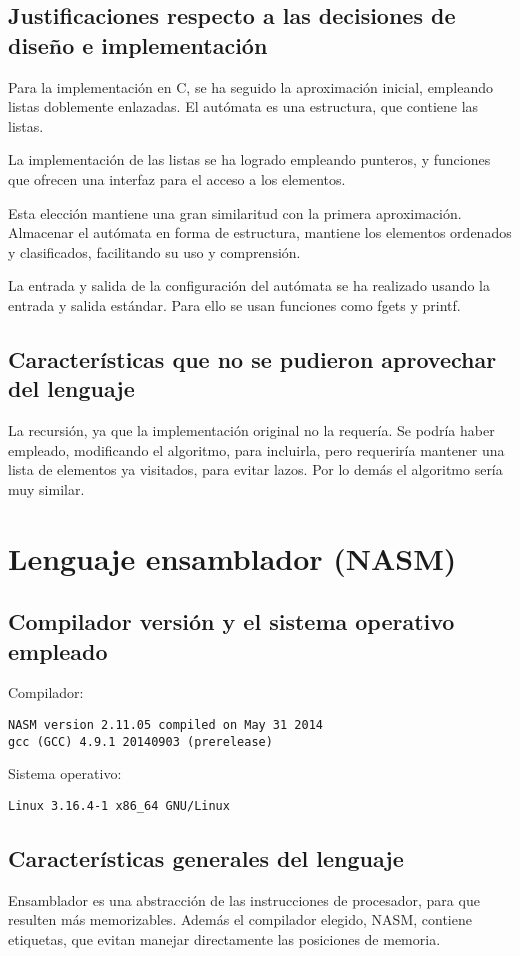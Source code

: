 \documentclass[12pt,a4paper]{article}
\begin{document}
\subsection{Justificaciones respecto a las decisiones de diseño e 
implementación}
Para la implementación en C, se ha seguido la aproximación inicial, empleando
listas doblemente enlazadas. El autómata es una estructura, que contiene las
listas.

La implementación de las listas se ha logrado empleando punteros, y funciones
que ofrecen una interfaz para el acceso a los elementos.

Esta elección mantiene una gran similaritud con la primera aproximación.
Almacenar el autómata en forma de estructura, mantiene los elementos ordenados y
clasificados, facilitando su uso y comprensión.

La entrada y salida de la configuración del autómata se ha realizado usando la
entrada y salida estándar. Para ello se usan funciones como fgets y printf.


\subsection{Características que no se pudieron aprovechar del lenguaje}
La recursión, ya que la implementación original no la requería. Se podría haber
empleado, modificando el algoritmo, para incluirla, pero requeriría mantener una
lista de elementos ya visitados, para evitar lazos. Por lo demás el algoritmo
sería muy similar.


\section{Lenguaje ensamblador (NASM)}

\subsection{Compilador versión y el sistema operativo empleado}
Compilador:
\begin{lstlisting}
NASM version 2.11.05 compiled on May 31 2014
gcc (GCC) 4.9.1 20140903 (prerelease)
\end{lstlisting}
Sistema operativo:
\begin{lstlisting}
Linux 3.16.4-1 x86_64 GNU/Linux
\end{lstlisting}


\subsection{Características generales del lenguaje}
Ensamblador es una abstracción de las instrucciones de procesador, para que
resulten más memorizables. Además el compilador elegido, NASM, contiene
etiquetas, que evitan manejar directamente las posiciones de memoria.
\end{document}
